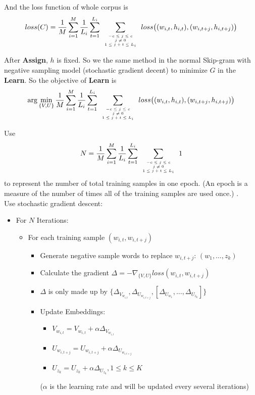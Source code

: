 And the loss function of whole corpus is $$loss(C)=\frac{1}{M}\sum_{i=1}^M\frac{1}{L_i}\sum_{t=1}^{L_i}\sum\limits_{\mbox{\tiny$\begin{array}{c}-c\leq j \leq c\\ j\neq 0\\ 1\leq j+t\leq L_i\end{array}$}}loss\big ( (w_{i,t},h_{i,t}),(w_{i,t+j},h_{i,t+j})\big )$$

	After \textbf{Assign}, $h$ is fixed. So we the same method in the normal Skip-gram with negative sampling model (stochastic gradient decent) to minimize $G$ in the \textbf{Learn}. So the objective of \textbf{Learn} is 
	$$\arg\min_{\{V,U\}} \frac{1}{M}\sum_{i=1}^M\frac{1}{L_i}\sum_{t=1}^{L_i}\sum\limits_{\mbox{\tiny$\begin{array}{c}-c\leq j \leq c\\ j\neq 0\\ 1\leq j+t\leq L_i\end{array}$}}loss\big ( (w_{i,t},h_{i,t}),(w_{i,t+j},h_{i,t+j})\big )$$
	
	
Use 
	$$N = \frac{1}{M}\sum_{i=1}^M\frac{1}{L_i}\sum_{t=1}^{L_i}\sum\limits_{\mbox{\tiny$\begin{array}{c}-c\leq j \leq c\\ j\neq 0\\ 1\leq j+t\leq L_i\end{array}$}} 1$$
	to represent the number of total training samples in one epoch. (An epoch is a measure of the number of times all of the training samples are used once.) .\\
	
	Use stochastic gradient descent: 
	\begin{itemize}
	\item For $N$ Iterations: 
		\begin{itemize}
		\item For each training sample $(w_{i,t},w_{i,{t+j}})$
		\begin{itemize}
		\item Generate negative sample words to replace $w_{i,t+j}$: $(w_1,\ldots,z_k)$
		\item Calculate the gradient $\Delta = -\nabla_{\{V,U\}} loss(w_{i,t},w_{i,{t+j}})$
		\item $\Delta$ is only made up by $\{\Delta_{V_{w_{i,t}}}, \Delta_{U_{w_{i,t+j}}}, [\Delta_{U_{w_1}},\ldots,\Delta_{U_{z_k}}]\}$
		\item Update Embeddings: 
		\begin{itemize}
		\item $V_{w_{i,t}} = V_{w_{i,t}}+\alpha\Delta_{V_{w_{i,t}}}$
		\item $U_{w_{i,t+j}} = U_{w_{i,t+j}}+\alpha\Delta_{U_{w_{i,t+j}}}$
		\item $U_{z_k} = U_{z_k}+\alpha\Delta_{U_{z_k}}, 1\leq k\leq K$ 
		\end{itemize}
		($\alpha$ is the learning rate and will be updated every several iterations)
		\end{itemize}
		\end{itemize}
	\end{itemize}

